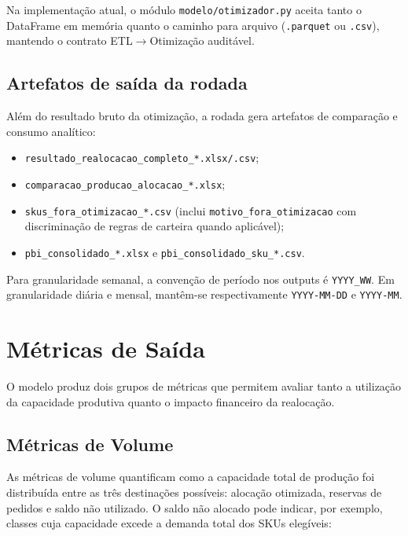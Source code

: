\documentclass[11pt,a4paper]{article}
\begin{document}
Na implementação atual, o módulo \texttt{modelo/otimizador.py} aceita tanto o
DataFrame em memória quanto o caminho para arquivo (\texttt{.parquet} ou
\texttt{.csv}), mantendo o contrato ETL$\rightarrow$Otimização auditável.

\subsection{Artefatos de saída da rodada}

Além do resultado bruto da otimização, a rodada gera artefatos de comparação e
consumo analítico:
\begin{itemize}
    \item \texttt{resultado\_realocacao\_completo\_*.xlsx/.csv};
    \item \texttt{comparacao\_producao\_alocacao\_*.xlsx};
    \item \texttt{skus\_fora\_otimizacao\_*.csv} (inclui \texttt{motivo\_fora\_otimizacao}
    com discriminação de regras de carteira quando aplicável);
    \item \texttt{pbi\_consolidado\_*.xlsx} e \texttt{pbi\_consolidado\_sku\_*.csv}.
\end{itemize}

Para granularidade semanal, a convenção de período nos outputs é
\texttt{YYYY\_WW}. Em granularidade diária e mensal, mantêm-se respectivamente
\texttt{YYYY-MM-DD} e \texttt{YYYY-MM}.

\section{Métricas de Saída}

O modelo produz dois grupos de métricas que permitem avaliar tanto a utilização
da capacidade produtiva quanto o impacto financeiro da realocação.

\subsection{Métricas de Volume}

As métricas de volume quantificam como a capacidade total de produção foi
distribuída entre as três destinações possíveis: alocação otimizada, reservas
de pedidos e saldo não utilizado. O saldo não alocado pode indicar, por
exemplo, classes cuja capacidade excede a demanda total dos SKUs elegíveis:
\end{document}
